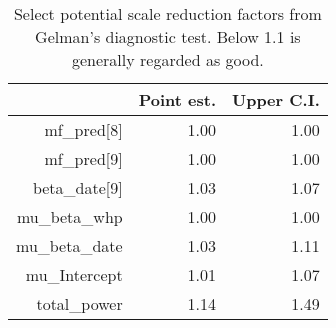 \begin{table}[]
\centering
\begin{tabular}{rrr}
  \hline
 & Point est. & Upper C.I. \\ 
  \hline
mf\_pred[8] & 1.00 & 1.00 \\ 
  mf\_pred[9] & 1.00 & 1.00 \\ 
  beta\_date[9] & 1.03 & 1.07 \\ 
  mu\_beta\_whp & 1.00 & 1.00 \\ 
  mu\_beta\_date & 1.03 & 1.11 \\ 
  mu\_Intercept & 1.01 & 1.07 \\ 
  total\_power & 1.14 & 1.49 \\ 
   \hline
\end{tabular}
\caption{Select potential scale reduction factors from Gelman's diagnostic test. Below 1.1 is generally regarded as good.} 
\label{tab:gelman}
\end{table}
